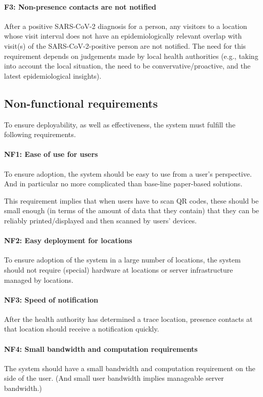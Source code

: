 \paragraph{F3: Non-presence contacts are not notified} After a positive SARS-CoV-2 diagnosis for a person, any visitors to a location whose visit interval does not have an epidemiologically relevant overlap with visit(s) of the SARS-CoV-2-positive person are not notified. The need for this requirement depends on judgements made by local health authorities (e.g., taking into account the local situation, the need to be convervative/proactive, and the latest epidemiological insights).

\subsection{Non-functional requirements}
To ensure deployability, as well as effectiveness, the system must fulfill the following requirements.

\paragraph{NF1: Ease of use for users} To ensure adoption, the system should be easy to use from a user’s perspective. And in particular no more complicated than base-line paper-based solutions.

This requirement implies that when users have to scan QR codes, these should be small enough (in terms of the amount of data that they contain) that they can be reliably printed/displayed and then scanned by users’ devices.


\paragraph{NF2: Easy deployment for locations} To ensure adoption of the system in a large number of locations, the system should not require (special) hardware at locations or server infrastructure managed by locations. 


\paragraph{NF3: Speed of notification} After the health authority has determined a trace location, presence contacts at that location should receive a notification quickly.


\paragraph{NF4: Small bandwidth and computation requirements} The system should have a small bandwidth and computation requirement on the side of the user. (And small user bandwidth implies manageable server bandwidth.)


